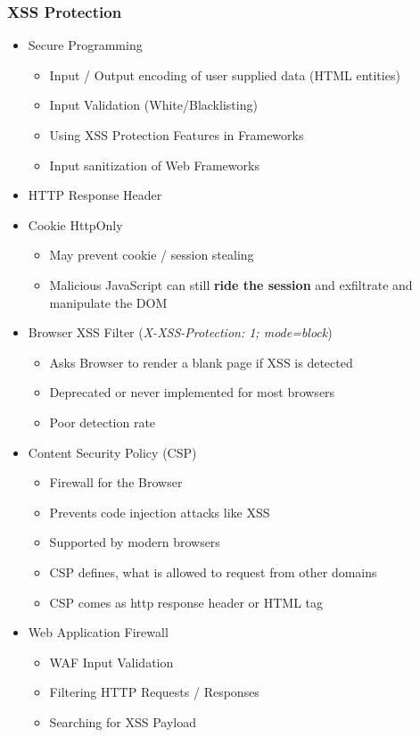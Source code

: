 \subsubsection{XSS Protection}
\begin{itemize}
    \item Secure Programming
    \begin{itemize}
        \item Input / Output encoding of user supplied data (HTML entities)
        \item Input Validation (White/Blacklisting)
        \item Using XSS Protection Features in Frameworks
        \item Input sanitization of Web Frameworks
    \end{itemize}
    \item HTTP Response Header
    \item Cookie HttpOnly
    \begin{itemize}
        \item May prevent cookie / session stealing
        \item Malicious JavaScript can still \textbf{ride the session} and exfiltrate and manipulate the DOM
    \end{itemize}
    \item Browser XSS Filter (\textit{X-XSS-Protection: 1; mode=block})
    \begin{itemize}
        \item Asks Browser to render a blank page if XSS is detected
        \item Deprecated or never implemented for most browsers
        \item Poor detection rate
    \end{itemize}
    \item Content Security Policy (CSP)
    \begin{itemize}
        \item Firewall for the Browser
        \item Prevents code injection attacks like XSS
        \item Supported by modern browsers
        \item CSP defines, what is allowed to request from other domains
        \item CSP comes as http response header or HTML tag
    \end{itemize}
    \item Web Application Firewall
    \begin{itemize}
        \item WAF Input Validation
        \item Filtering HTTP Requests / Responses
        \item Searching for XSS Payload
    \end{itemize}
\end{itemize}

